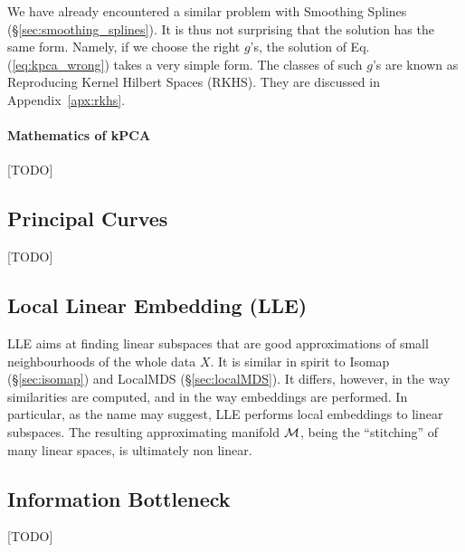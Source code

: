 We have already encountered a similar problem with Smoothing Splines (\S\ref{sec:smoothing_splines}). It is thus not surprising that the solution has the same form. 
Namely, if we choose the right $g$'s, the solution of Eq.(\ref{eq:kpca_wrong}) takes a very simple form. 
The classes of such $g$'s are known as Reproducing Kernel Hilbert Spaces (RKHS). 
They are discussed in Appendix~\ref{apx:rkhs}.



\paragraph{Mathematics of kPCA}
[TODO]



\subsection{Principal Curves}
[TODO]



\subsection{Local Linear Embedding (LLE)}
LLE aims at finding linear subspaces that are good approximations of small neighbourhoods of the whole data $X$.
It is similar in spirit to Isomap (\S\ref{sec:isomap}) and LocalMDS (\S\ref{sec:localMDS}).
It differs, however, in the way similarities are computed, and in the way embeddings are performed. 
In particular, as the name may suggest, LLE performs local embeddings to linear subspaces. The resulting approximating manifold $\mathcal{M}$, being the ``stitching'' of many linear spaces, is ultimately non linear.




\subsection{Information Bottleneck}
[TODO]

